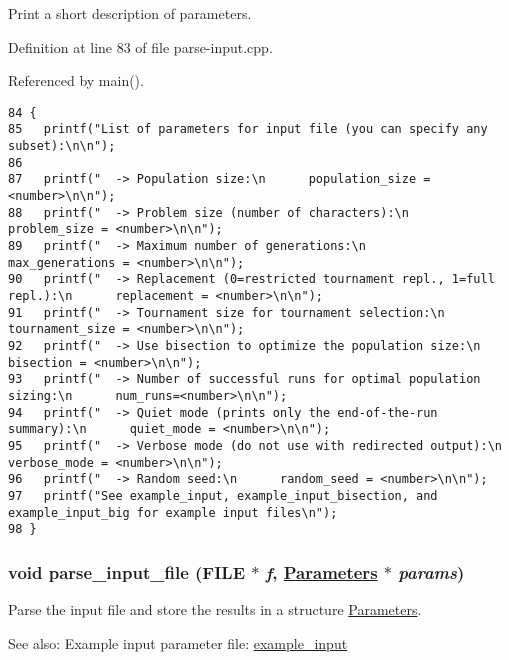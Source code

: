 Print a short description of parameters. 



Definition at line 83 of file parse-input.cpp.

Referenced by main().

\begin{Code}\begin{verbatim}84 {
85   printf("List of parameters for input file (you can specify any subset):\n\n");
86 
87   printf("  -> Population size:\n      population_size = <number>\n\n");
88   printf("  -> Problem size (number of characters):\n      problem_size = <number>\n\n");
89   printf("  -> Maximum number of generations:\n      max_generations = <number>\n\n");
90   printf("  -> Replacement (0=restricted tournament repl., 1=full repl.):\n      replacement = <number>\n\n");
91   printf("  -> Tournament size for tournament selection:\n      tournament_size = <number>\n\n");
92   printf("  -> Use bisection to optimize the population size:\n      bisection = <number>\n\n");
93   printf("  -> Number of successful runs for optimal population sizing:\n      num_runs=<number>\n\n");
94   printf("  -> Quiet mode (prints only the end-of-the-run summary):\n      quiet_mode = <number>\n\n");
95   printf("  -> Verbose mode (do not use with redirected output):\n      verbose_mode = <number>\n\n");
96   printf("  -> Random seed:\n      random_seed = <number>\n\n");
97   printf("See example_input, example_input_bisection, and example_input_big for example input files\n");
98 }
\end{verbatim}\end{Code}


\hypertarget{parse-input_8cpp_ecc496a88afbe998e2577dfe766dbd0e}{
\subsubsection[parse\_\-input\_\-file]{\setlength{\rightskip}{0pt plus 5cm}void parse\_\-input\_\-file (FILE $\ast$ {\em f}, \hyperlink{struct_parameters}{Parameters} $\ast$ {\em params})}}
\label{parse-input_8cpp_ecc496a88afbe998e2577dfe766dbd0e}


Parse the input file and store the results in a structure \hyperlink{struct_parameters}{Parameters}. 

\begin{Desc}
\item[See also:]Example input parameter file: \hyperlink{example__input-example}{example\_\-input} \end{Desc}


